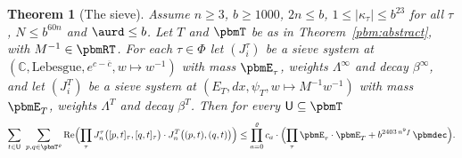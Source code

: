 \documentclass[10pt]{amsart}
\newtheorem{theorem}{Theorem}[section]
\theoremstyle{definition}
\theoremstyle{remark}
\newcommand{\C}{\mathbb C}
\newcommand{\Rel}{\operatorname{Re}}
\providecommand{\auPl}{\Phi}
\providecommand{\aubar}[1]{\overline{#1}}
\begin{document}
\begin{theorem}[The sieve]\label{pbm:sieve}
Assume $n\ge3$, $b\ge1000$, $2n\le b$, $1\le|\kappa_\tau|\le b^{23}$ for all $\tau$, $N\le b^{60n}$
and $\aurd\le b$. Let $T$ and $\pbmT$ be as in Theorem~\ref{pbm:abstract}, with $M^{-1}\in\pbmRT$. For
each $\tau\in\auPl$ let $(J^\tau_i)$ be a sieve system at $(\C,\text{Lebesgue},e^{c-\aubar c},w\mapsto
w^{-1})$ with mass $\pbmE_\tau$, weights $\Lambda^\infty$ and decay $\beta^\infty$, and let $(J^T_i)$
be a sieve system at $(E_T,dx,\psi_T,w\mapsto M^{-1}w^{-1})$ with mass $\pbmE_T$, weights $\Lambda^T$
and decay $\beta^T$. Then for every $\mathsf U\subseteq\pbmT$
\[
\sum_{t\in\mathsf U}\ \sum_{p,q\in\pbmT^\varrho}\Rel\Bigl(\prod_\tau J^\tau_n\bigl([p,t]_\tau,[q,t]_\tau
\bigr)\cdot J^T_n\bigl((p,t),(q,t)\bigr)\Bigr)\le\prod_{a=0}^{\varrho}c_a\cdot\Bigl(\prod_\tau\pbmE_\tau
\cdot\pbmE_T+b^{2403\,n^9f}\,\pbmdec\Bigr).
\]
\end{theorem}
\end{document}
